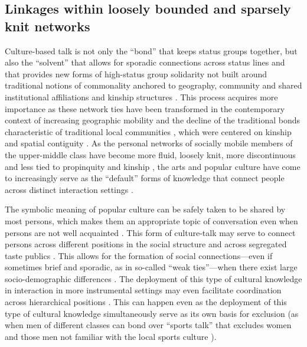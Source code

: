 \documentclass[11pt]{article}
\begin{document}
\subsection{Linkages within loosely bounded and sparsely knit networks}
Culture-based talk is not only  the ``bond'' that keeps status groups together, but also the ``solvent'' that allows for sporadic connections across status lines and that provides new forms of high-status group solidarity not built around traditional notions of commonality anchored to geography, community and shared institutional affiliations and kinship structures \citep{holt98}. This process acquires more importance as these network ties have been transformed in the contemporary context of increasing geographic mobility \citep{griswold_wright04} and the decline of the traditional bonds characteristic of traditional local communities \citep{wellman79}, which were centered on kinship and spatial contiguity \citep{dimaggio_mohr85}.  As the personal networks of socially mobile members of the upper-middle class have become more fluid, loosely knit, more discontinuous and less tied to propinquity and kinship \citep{meyrowitz85, wellman_wortley90, wellman_etal88}, the arts and popular culture have come to increasingly serve as the ``default'' forms of knowledge that connect people across distinct interaction settings \citep{dimaggio87}.

The symbolic meaning  of popular culture can be safely taken to be shared by most persons, which makes them an appropriate topic of conversation even when persons are not well acquainted  \citep[460-461]{fine77}. This form of culture-talk may serve to connect persons across different positions in the social structure and across segregated taste publics \cite{ikegami05, mische10}.   This allows for the formation of social connections---even if sometimes brief and sporadic, as in so-called ``weak ties''---when there exist large socio-demographic differences \citep{lizardo06a}.  The deployment of this type of cultural knowledge in interaction in more instrumental settings may even facilitate coordination across hierarchical positions \citep{erickson96}. This can happen even as the deployment of this type of cultural knowledge simultaneously serve as its own basis for exclusion (as when men of different classes can bond over ``sports talk'' that excludes women and those men not familiar with the local sports culture \citep{erickson96, purcell07, pachuki_breiger10}).  
\end{document}
